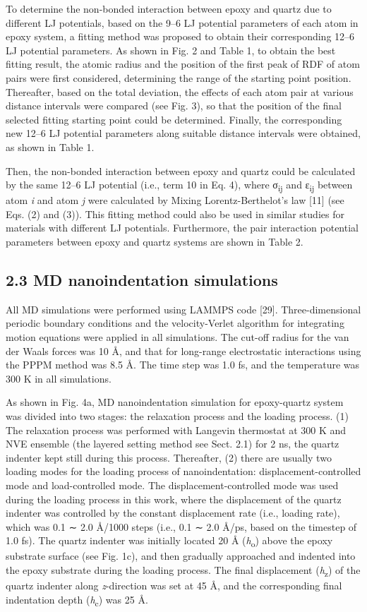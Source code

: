 \documentclass{article}
\begin{document}
To determine the non-bonded interaction between epoxy and quartz due to different LJ potentials, based on the 9–6 LJ potential parameters of each atom in epoxy system, a fitting method was proposed to obtain their corresponding 12–6 LJ potential parameters. As shown in Fig. 2 and Table 1, to obtain the best fitting result, the atomic radius and the position of the first peak of RDF of atom pairs were first considered, determining the range of the starting point position. Thereafter, based on the total deviation, the effects of each atom pair at various distance intervals were compared (see Fig. 3), so that the position of the final selected fitting starting point could be determined. Finally, the corresponding new 12–6 LJ potential parameters along suitable distance intervals were obtained, as shown in Table 1.

Then, the non-bonded interaction between epoxy and quartz could be calculated by the same 12–6 LJ potential (i.e., term 10 in Eq. 4), where σ\textsubscript{ij} and ε\textsubscript{ij} between atom \emph{i} and atom \emph{j} were calculated by Mixing Lorentz-Berthelot’s law [11] (see Eqs. (2) and (3)). This fitting method could also be used in similar studies for materials with different LJ potentials. Furthermore, the pair interaction potential parameters between epoxy and quartz systems are shown in Table 2.

\subsection*{2.3 MD nanoindentation simulations}

All MD simulations were performed using LAMMPS code [29]. Three-dimensional periodic boundary conditions and the velocity-Verlet algorithm for integrating motion equations were applied in all simulations. The cut-off radius for the van der Waals forces was 10 Å, and that for long-range electrostatic interactions using the PPPM method was 8.5 Å. The time step was 1.0 fs, and the temperature was 300 K in all simulations.

As shown in Fig. 4a, MD nanoindentation simulation for epoxy-quartz system was divided into two stages: the relaxation process and the loading process. (1) The relaxation process was performed with Langevin thermostat at 300 K and NVE ensemble (the layered setting method see Sect. 2.1) for 2 ns, the quartz indenter kept still during this process. Thereafter, (2) there are usually two loading modes for the loading process of nanoindentation: displacement-controlled mode and load-controlled mode. The displacement-controlled mode was used during the loading process in this work, where the displacement of the quartz indenter was controlled by the constant displacement rate (i.e., loading rate), which was 0.1 ∼ 2.0 Å/1000 steps (i.e., 0.1 ∼ 2.0 Å/ps, based on the timestep of 1.0 fs). The quartz indenter was initially located 20 Å (\emph{h}\textsubscript{o}) above the epoxy substrate surface (see Fig. 1c), and then gradually approached and indented into the epoxy substrate during the loading process. The final displacement (\emph{h}\textsubscript{z}) of the quartz indenter along \emph{z}-direction was set at 45 Å, and the corresponding final indentation depth (\emph{h}\textsubscript{c}) was 25 Å.
\end{document}
